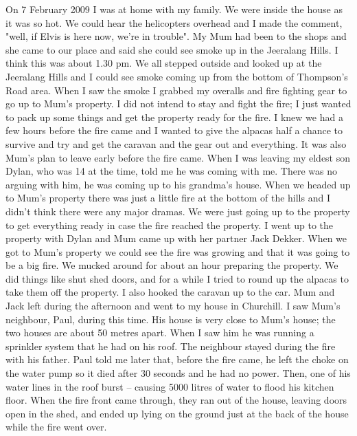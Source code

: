 \documentclass[a4paper]{article}
\begin{document}
        On 7 February 2009 I was at home with my family. We were inside the house as it was so hot. We could hear the helicopters overhead and I made the comment, "well, if Elvis is here now, we're in trouble". My Mum had been to the shops and she came to our place and said she could see smoke up in the Jeeralang Hills. I think this was about 1.30 pm.
        We all stepped outside and looked up at the Jeeralang Hills and I could see smoke coming up from the bottom of Thompson's Road area. When I saw the smoke I grabbed my overalls and fire fighting gear to go up to Mum's property. I did not intend to stay and fight the fire; I just wanted to pack up some things and get the property ready for the fire. I knew we had a few hours before the fire came and I wanted to give the alpacas half a chance to survive and try and get the caravan and the gear out and everything. It was also Mum's plan to leave early before the fire came.
        When I was leaving my eldest son Dylan, who was 14 at the time, told me he was coming with me. There was no arguing with him, he was coming up to his grandma's house.
        When we headed up to Mum's property there was just a little fire at the bottom of the hills and I didn't think there were any major dramas. We were just going up to the property to get everything ready in case the fire reached the property. I went up to the property with Dylan and Mum came up with her partner Jack Dekker. When we got to Mum's property we could see the fire was growing and that it was going to be a big fire.
        We mucked around for about an hour preparing the property. We did things like shut shed doors, and for a while I tried to round up the alpacas to take them off the property. I also hooked the caravan up to the car. Mum and Jack left during the afternoon and went to my house in Churchill.
        I saw Mum's neighbour, Paul, during this time. His house is very close to Mum's house; the two houses are about 50 metres apart. When I saw him he was running a sprinkler system that he had on his roof. The neighbour stayed during the fire with his father. Paul told me later that, before the fire came, he left the choke on the water pump so it died after 30 seconds and he had no power. Then, one of his water lines in the roof burst – causing 5000 litres of water to flood his kitchen floor. When the fire front came through, they ran out of the house, leaving doors open in the shed, and ended up lying on the ground just at the back of the house while the fire went over.
\end{document}
